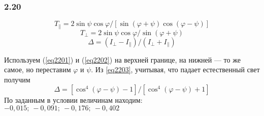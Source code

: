 \subsubsection*{2.20}
\begin{equation}\label{eq2201}
	T_{\|} = 2\sin{\psi}\cos{\varphi}/ \left[\sin{(\varphi + \psi)} \cos{(\varphi - \psi)}  \right]
\end{equation}
\begin{equation}\label{eq2202}
	T_{\bot} = 2\sin{\psi}\cos{\varphi}/\sin{(\varphi + \psi)}
\end{equation}
\begin{equation}\label{eq2203}
	\Delta = (I_{\bot} - I_{\|}) / (I_{\bot} + I_{\|})
\end{equation}

Используем (\ref{eq2201}) и (\ref{eq2202}) на верхней границе, на нижней --- то же самое, но переставим $\varphi$ и $\psi$. Из \ref{eq2203}, учитывая, что падает естественный свет получим 
\begin{equation*}
	\Delta = \left[ \cos^4(\varphi - \psi) - 1 \right] / \left[ \cos^4(\varphi - \psi) + 1 \right] 
\end{equation*}
По заданным в условии величинам находим: $-0,015; \ -0,091; \ -0,176; \ -0,402$